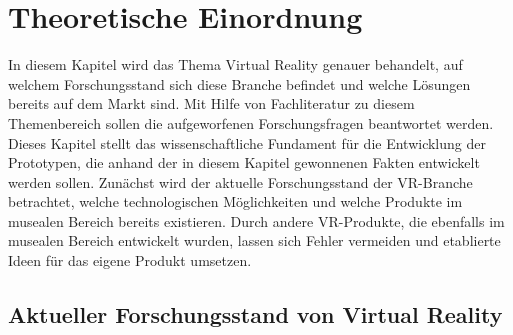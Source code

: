 \documentclass[a4paper,12pt,oneside]{article}
\begin{document}
  \section{Theoretische Einordnung}
    In diesem Kapitel wird das Thema Virtual Reality genauer behandelt, auf welchem
    Forschungsstand sich diese Branche befindet und welche Lösungen bereits auf 
    dem Markt sind. Mit Hilfe von Fachliteratur zu diesem Themenbereich sollen die
    aufgeworfenen Forschungsfragen beantwortet werden. Dieses Kapitel stellt das
    wissenschaftliche Fundament für die Entwicklung der Prototypen, die anhand der in
    diesem Kapitel gewonnenen Fakten entwickelt werden sollen. Zunächst wird der aktuelle
    Forschungsstand der VR-Branche betrachtet, welche technologischen
    Möglichkeiten und welche Produkte im musealen Bereich bereits existieren.
    Durch andere VR-Produkte, die ebenfalls im musealen Bereich entwickelt wurden, lassen
    sich Fehler vermeiden und etablierte Ideen für das eigene Produkt umsetzen.
    \subsection{Aktueller Forschungsstand von Virtual Reality}
      
\end{document}
